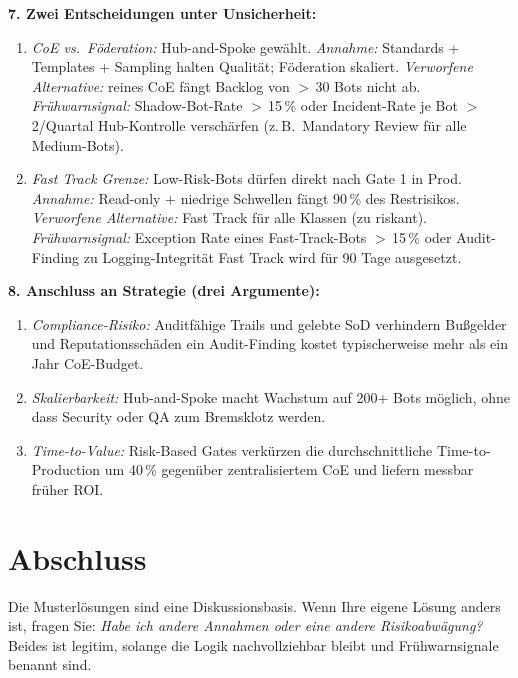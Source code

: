 \documentclass[11pt,a4paper,oneside]{article}
\begin{document}
\begin{loesungbox}
\smallskip
\textbf{7. Zwei Entscheidungen unter Unsicherheit:}
\begin{enumerate}
  \item \emph{CoE vs.\ F\"oderation:} Hub-and-Spoke gew\"ahlt. \emph{Annahme:} Standards + Templates + Sampling halten Qualit\"at; F\"oderation skaliert. \emph{Verworfene Alternative:} reines CoE \textendash{} f\"angt Backlog von $>$\,30 Bots nicht ab. \emph{Fr\"uhwarnsignal:} Shadow-Bot-Rate $>$\,15\,\% oder Incident-Rate je Bot $>$\,2/Quartal \textrightarrow{} Hub-Kontrolle versch\"arfen (z.\,B.\ Mandatory Review f\"ur alle Medium-Bots).
  \item \emph{Fast Track Grenze:} Low-Risk-Bots d\"urfen direkt nach Gate 1 in Prod. \emph{Annahme:} Read-only + niedrige Schwellen f\"angt 90\,\% des Restrisikos. \emph{Verworfene Alternative:} Fast Track f\"ur alle Klassen (zu riskant). \emph{Fr\"uhwarnsignal:} Exception Rate eines Fast-Track-Bots $>$\,15\,\% oder Audit-Finding zu Logging-Integrit\"at \textrightarrow{} Fast Track wird f\"ur 90 Tage ausgesetzt.
\end{enumerate}

\smallskip
\textbf{8. Anschluss an Strategie (drei Argumente):}
\begin{enumerate}
  \item \emph{Compliance-Risiko:} Auditf\"ahige Trails und gelebte SoD verhindern Bu{\ss}gelder und Reputations\-sch\"aden \textendash{} ein Audit-Finding kostet typischerweise mehr als ein Jahr CoE-Budget.
  \item \emph{Skalierbarkeit:} Hub-and-Spoke macht Wachstum auf 200+ Bots m\"oglich, ohne dass Security oder QA zum Bremsklotz werden.
  \item \emph{Time-to-Value:} Risk-Based Gates verk\"urzen die durchschnittliche Time-to-Production um 40\,\% gegen\"uber zentralisiertem CoE und liefern messbar fr\"uher ROI.
\end{enumerate}
\end{loesungbox}

\clearpage

\section*{Abschluss}
\thispagestyle{plain}

\noindent Die Musterl\"osungen sind eine Diskussionsbasis. Wenn Ihre eigene L\"osung anders ist, fragen Sie: \emph{Habe ich andere Annahmen \textendash{} oder eine andere Risikoabw\"agung?} Beides ist legitim, solange die Logik nachvollziehbar bleibt und Fr\"uhwarnsignale benannt sind.
\end{document}
